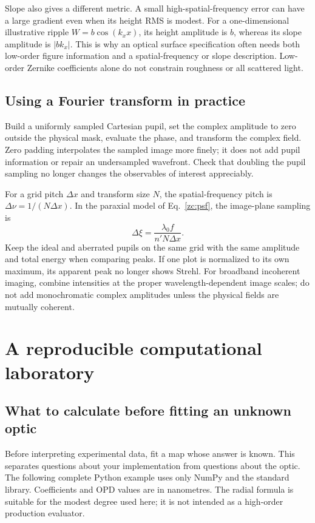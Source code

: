 Slope also gives a different metric. A small high-spatial-frequency
error can have a large gradient even when its height RMS is modest.
For a one-dimensional illustrative ripple $W=b\cos(k_xx)$, its
height amplitude is $b$, whereas its slope amplitude is $|bk_x|$.
This is why an optical surface specification often needs both low-order
figure information and a spatial-frequency or slope description.
Low-order Zernike coefficients alone do not constrain roughness or
all scattered light.

\section{Using a Fourier transform in practice}
Build a uniformly sampled Cartesian pupil, set the complex amplitude
to zero outside the physical mask, evaluate the phase, and transform
the complex field. Zero padding interpolates the sampled image more
finely; it does not add pupil information or repair an undersampled
wavefront. Check that doubling the pupil sampling no longer changes
the observables of interest appreciably.

For a grid pitch $\Delta x$ and transform size $N$, the spatial-frequency
pitch is $\Delta\nu=1/(N\Delta x)$. In the paraxial model of
Eq.~\eqref{zc:psf}, the image-plane sampling is
\begin{equation}
 \Delta\xi=\frac{\lambda_0 f}{n'N\Delta x}.
\end{equation}
Keep the ideal and aberrated pupils on the same grid with the same
amplitude and total energy when comparing peaks. If one plot is
normalized to its own maximum, its apparent peak no longer shows
Strehl. For broadband incoherent imaging, combine intensities at the
proper wavelength-dependent image scales; do not add monochromatic
complex amplitudes unless the physical fields are mutually coherent.

\chapter{A reproducible computational laboratory}
\label{zc:lab}

\section{What to calculate before fitting an unknown optic}
Before interpreting experimental data, fit a map whose answer is known.
This separates questions about your implementation from questions about
the optic. The following complete Python example uses only NumPy and
the standard library. Coefficients and OPD values are in nanometres.
The radial formula is suitable for the modest degree used here; it is
not intended as a high-order production evaluator.

